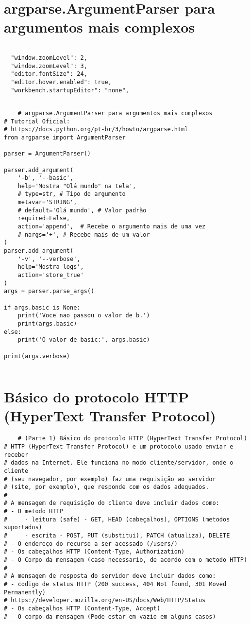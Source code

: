 \documentclass{article}
\begin{document}
\section{argparse.ArgumentParser para argumentos mais complexos}
\begin{lstlisting}
    
  "window.zoomLevel": 2,
  "window.zoomLevel": 3,
  "editor.fontSize": 24,
  "editor.hover.enabled": true,
  "workbench.startupEditor": "none",
    
\end{lstlisting}

\begin{lstlisting}
    # argparse.ArgumentParser para argumentos mais complexos
# Tutorial Oficial:
# https://docs.python.org/pt-br/3/howto/argparse.html
from argparse import ArgumentParser

parser = ArgumentParser()

parser.add_argument(
    '-b', '--basic',
    help='Mostra "Olá mundo" na tela',
    # type=str, # Tipo do argumento
    metavar='STRING',
    # default='Olá mundo', # Valor padrão
    required=False,
    action='append',  # Recebe o argumento mais de uma vez
    # nargs='+', # Recebe mais de um valor
)
parser.add_argument(
    '-v', '--verbose',
    help='Mostra logs',
    action='store_true'
)
args = parser.parse_args()

if args.basic is None:
    print('Voce nao passou o valor de b.')
    print(args.basic)
else:
    print('O valor de basic:', args.basic)

print(args.verbose)
    
\end{lstlisting}
\section{
     Básico do protocolo HTTP (HyperText Transfer Protocol)}
\begin{lstlisting}
    # (Parte 1) Básico do protocolo HTTP (HyperText Transfer Protocol)
# HTTP (HyperText Transfer Protocol) e um protocolo usado enviar e receber
# dados na Internet. Ele funciona no modo cliente/servidor, onde o cliente
# (seu navegador, por exemplo) faz uma requisição ao servidor
# (site, por exemplo), que responde com os dados adequados.
#
# A mensagem de requisição do cliente deve incluir dados como:
# - O metodo HTTP
#     - leitura (safe) - GET, HEAD (cabeçalhos), OPTIONS (metodos suportados)
#     - escrita - POST, PUT (substitui), PATCH (atualiza), DELETE
# - O endereço do recurso a ser acessado (/users/)
# - Os cabeçalhos HTTP (Content-Type, Authorization)
# - O Corpo da mensagem (caso necessario, de acordo com o metodo HTTP)
#
# A mensagem de resposta do servidor deve incluir dados como:
# - codigo de status HTTP (200 success, 404 Not found, 301 Moved Permanently)
# https://developer.mozilla.org/en-US/docs/Web/HTTP/Status
# - Os cabeçalhos HTTP (Content-Type, Accept)
# - O corpo da mensagem (Pode estar em vazio em alguns casos)
\end{lstlisting}
\end{document}
